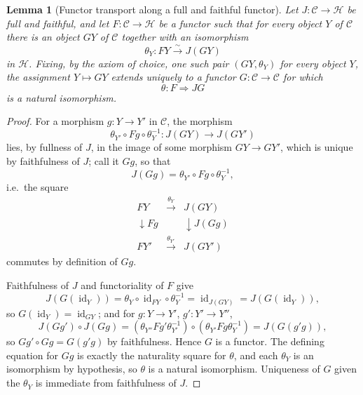 \documentclass[11pt]{article}
\newtheorem{lemma}[theorem]{Lemma}
\DeclareMathOperator{\id}{id}
\begin{document}
\begin{lemma}[Functor transport along a full and faithful functor]
\label{lem:functor-transport}
Let $J:\mathcal C\to\mathcal H$ be full and faithful, and let
$F:\mathcal C\to\mathcal H$ be a functor such that for every object $Y$ of
$\mathcal C$ there is an object $GY$ of $\mathcal C$ together with an
isomorphism
\[
\theta_Y:FY\xrightarrow{\sim}J(GY)
\]
in $\mathcal H$. Fixing, by the axiom of choice, one such pair
$(GY,\theta_Y)$ for every object $Y$, the assignment $Y\mapsto GY$ extends
uniquely to a functor $G:\mathcal C\to\mathcal C$ for which
\[
\theta:F\Rightarrow JG
\]
is a natural isomorphism.
\end{lemma}

\begin{proof}
For a morphism $g:Y\to Y'$ in $\mathcal C$, the morphism
\[
\theta_{Y'}\circ Fg\circ\theta_Y^{-1}:J(GY)\to J(GY')
\]
lies, by fullness of $J$, in the image of some morphism $GY\to GY'$, which
is unique by faithfulness of $J$; call it $Gg$, so that
\[
J(Gg)=\theta_{Y'}\circ Fg\circ\theta_Y^{-1},
\]
i.e.\ the square
\[
\begin{array}{ccc}
FY & \xrightarrow{\theta_Y} & J(GY)\\
\downarrow Fg & & \downarrow J(Gg)\\
FY' & \xrightarrow{\theta_{Y'}} & J(GY')
\end{array}
\]
commutes by definition of $Gg$.

Faithfulness of $J$ and functoriality of $F$ give
\[
J(G(\id_Y))
=
\theta_Y\circ\id_{FY}\circ\theta_Y^{-1}
=
\id_{J(GY)}
=
J(G(\id_Y)),
\]
so $G(\id_Y)=\id_{GY}$; and for $g:Y\to Y'$, $g':Y'\to Y''$,
\[
J(Gg')\circ J(Gg)
=
(\theta_{Y''}Fg'\theta_{Y'}^{-1})
\circ
(\theta_{Y'}Fg\theta_Y^{-1})
=
J(G(g'g)),
\]
so $Gg'\circ Gg=G(g'g)$ by faithfulness. Hence $G$ is a functor. The
defining equation for $Gg$ is exactly the naturality square for $\theta$,
and each $\theta_Y$ is an isomorphism by hypothesis, so $\theta$ is a
natural isomorphism. Uniqueness of $G$ given the $\theta_Y$ is immediate
from faithfulness of $J$.
\end{proof}
\end{document}
